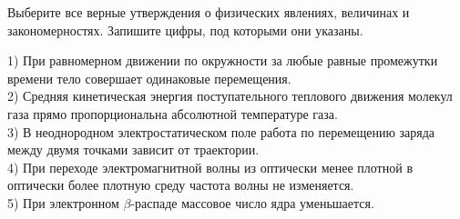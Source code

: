 \begin{taskbasic}[code={\label{task:kim18_img20}}]
Выберите все верные утверждения о физических явлениях, величинах и закономерностях. Запишите цифры, под которыми они указаны.

1) При равномерном движении по окружности за любые равные промежутки времени тело совершает одинаковые перемещения.\\
2) Средняя кинетическая энергия поступательного теплового движения молекул газа прямо пропорциональна абсолютной температуре газа.\\
3) В неоднородном электростатическом поле работа по перемещению заряда между двумя точками зависит от траектории.\\
4) При переходе электромагнитной волны из оптически менее плотной в оптически более плотную среду частота волны не изменяется.\\
5) При электронном $\beta$-распаде массовое число ядра уменьшается.

\end{taskbasic}
